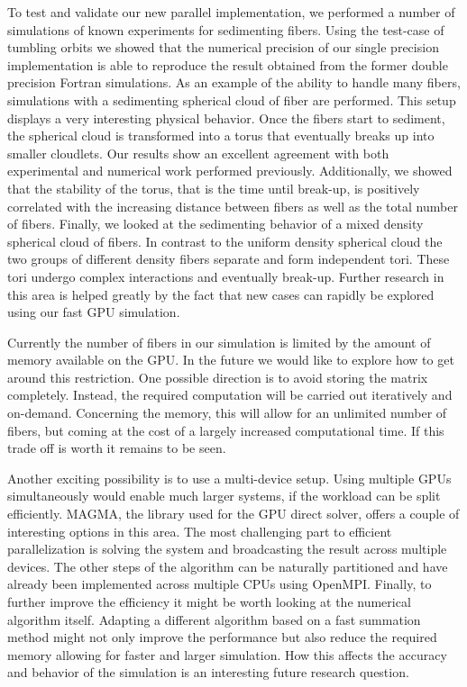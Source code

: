 To test and validate our new parallel implementation, we performed a number of simulations of known experiments for sedimenting fibers. Using the test-case of tumbling orbits we showed that the numerical precision of our single precision implementation is able to reproduce the result obtained from the former double precision Fortran simulations. As an example of the ability to handle many fibers, simulations with a sedimenting spherical cloud of fiber are performed. This setup displays a very interesting physical behavior. Once the fibers start to sediment, the spherical cloud is transformed into a torus that eventually breaks up into smaller cloudlets. Our results show an excellent agreement with both experimental and numerical work performed previously. Additionally, we showed that the stability of the torus, that is the time until break-up, is positively correlated with the increasing distance between fibers as well as the total number of fibers. Finally, we looked at the sedimenting behavior of a mixed density spherical cloud of fibers. In contrast to the uniform density spherical cloud the two groups of different density fibers separate and form independent tori. These tori undergo complex interactions and eventually break-up. Further research in this area is helped greatly by the fact that new cases can rapidly be explored using our fast GPU simulation.

Currently the number of fibers in our simulation is limited by the amount of memory available on the GPU. In the future we would like to explore how to get around this restriction. One possible direction is to avoid storing the matrix completely. Instead, the required computation will be carried out iteratively and on-demand. Concerning the memory, this will allow for an unlimited number of fibers, but coming at the cost of a largely increased computational time. If this trade off is worth it remains to be seen.

Another exciting possibility is to use a multi-device setup. Using multiple GPUs simultaneously would enable much larger systems, if the workload can be split efficiently. MAGMA, the library used for the GPU direct solver, offers a couple of interesting options in this area. The most challenging part to efficient parallelization is solving the system and broadcasting the result across multiple devices. The other steps of the algorithm can be naturally partitioned and have already been implemented across multiple CPUs using OpenMPI.
\enlargethispage{\baselineskip}
Finally, to further improve the efficiency it might be worth looking at the numerical algorithm itself. Adapting a different algorithm based on a fast summation method might not only improve the performance but also reduce the required memory allowing for faster and larger simulation. How this affects the accuracy and behavior of the simulation is an interesting future research question.
